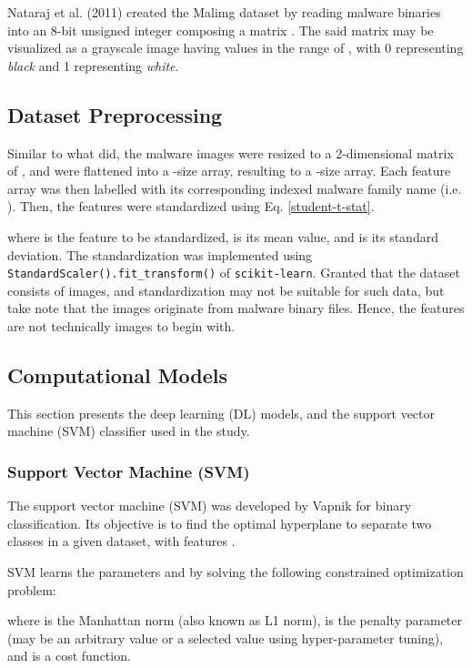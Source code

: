 \documentclass[sigconf]{acmart}
\begin{document}
Nataraj et al. (2011)\cite{nataraj2011malware} created the Malimg dataset by reading malware binaries into an 8-bit unsigned integer composing a matrix . The said matrix may be visualized as a grayscale image having values in the range of , with 0 representing \textit{black} and 1 representing \textit{white}.

\subsection{Dataset Preprocessing}
Similar to what \cite{garcia2016random} did, the malware images were resized to a 2-dimensional matrix of , and were flattened into a -size array, resulting to a -size array. Each feature array was then labelled with its corresponding indexed malware family name (i.e. ). Then, the features were standardized using Eq. \ref{student-t-stat}.


where  is the feature to be standardized,  is its mean value, and  is its standard deviation. The standardization was implemented using \texttt{StandardScaler().fit\_transform()} of \texttt{scikit-learn}\cite{scikit-learn}. Granted that the dataset consists of images, and standardization may not be suitable for such data, but take note that the images originate from malware binary files. Hence, the features are not technically images to begin with.

\subsection{Computational Models}\label{computational-models}
This section presents the deep learning (DL) models, and the support vector machine (SVM) classifier used in the study.

\subsubsection{Support Vector Machine (SVM)}\label{svm}
The support vector machine (SVM) was developed by Vapnik\cite{Cortes} for binary classification. Its objective is to find the optimal hyperplane  to separate two classes in a given dataset, with features .

SVM learns the parameters  and  by solving the following constrained optimization problem:



where  is the Manhattan norm (also known as L1 norm),  is the penalty parameter (may be an arbitrary value or a selected value using hyper-parameter tuning), and  is a cost function.
\end{document}
